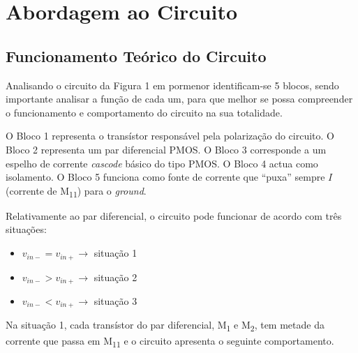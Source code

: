 \documentclass[11pt]{article}
\numberwithin{equation}{section}
\begin{document}
\pagebreak

\section{Abordagem ao Circuito}

\subsection{Funcionamento Teórico do Circuito}


Analisando o circuito da Figura 1 em pormenor identificam-se 5 blocos, sendo importante analisar a função de cada um, para que melhor se possa compreender o funcionamento e comportamento do circuito na sua totalidade. 

O Bloco 1 representa o transístor responsável pela polarização do circuito. O Bloco 2 representa um par diferencial PMOS. O Bloco 3 corresponde a um espelho de corrente \textit{cascode} básico do tipo PMOS. O Bloco 4 actua como isolamento. O Bloco 5 funciona como fonte de corrente que ``puxa'' sempre $I$ (corrente de M\textsubscript{11}) para o \textit{ground}.

Relativamente ao par diferencial, o circuito pode funcionar de acordo com três situações:

\begin{itemize}
	\vspace{-3mm}
	\item $v_{in-} = v_{in+} \rightarrow$ situação 1
	\vspace{-1.5mm}
	\item $v_{in-} > v_{in+} \rightarrow$ situação 2
	\vspace{-1.5mm}
	\item $v_{in-} < v_{in+} \rightarrow$ situação 3
\end{itemize}

Na situação 1, cada transístor do par diferencial, M\textsubscript{1} e M\textsubscript{2}, tem metade da corrente que passa em M\textsubscript{11} e o circuito apresenta o seguinte comportamento.
\end{document}
